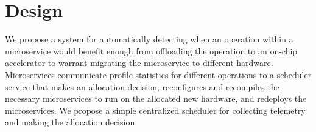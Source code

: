 \section{Design}
We propose a system for automatically detecting when an operation within a microservice would benefit enough from offloading the operation to an on-chip accelerator to warrant migrating the microservice to different hardware.
Microservices communicate profile statistics for different operations to a scheduler service that makes an allocation decision, reconfigures and recompiles the necessary microservices to run on the allocated new hardware, and redeploys the microservices.
We propose a simple centralized scheduler for collecting telemetry and making the allocation decision.
